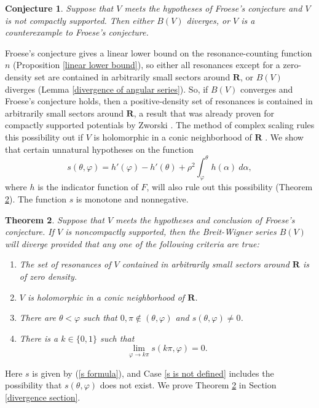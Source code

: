 \documentclass[reqno,12pt,letterpaper]{amsart}
\newcommand{\RR}{\mathbf{R}}
\newtheorem{theorem}{Theorem}[section]
\newtheorem{conjecture}[theorem]{Conjecture}
\theoremstyle{definition}
\begin{document}
\begin{conjecture}
\label{weak conjecture}
Suppose that $V$ meets the hypotheses of Froese's conjecture and $V$ is not compactly supported. Then either $B(V)$ diverges, or $V$ is a counterexample to Froese's conjecture.
\end{conjecture}
Froese's conjecture gives a linear lower bound on the resonance-counting function $n$ (Proposition \ref{linear lower bound}), so either all resonances except for a zero-density set are contained in arbitrarily small sectors around $\RR$, or $B(V)$ diverges (Lemma \ref{divergence of angular series}).
So, if $B(V)$ converges and Froese's conjecture holds, then a positive-density set of resonances is contained in arbitrarily small sectors around $\RR$, a result that was already proven for compactly supported potentials by Zworski \cite{zworski1987distribution}.
The method of complex scaling rules this possibility out if $V$ is holomorphic in a conic neighborhood of $\RR$ \cite[Corollary 12.14]{sjostrand2002lectures}. We show that certain unnatural hypotheses on the function
\begin{equation}
\label{s formula}
s(\theta, \varphi) = h'(\varphi) - h'(\theta) + \rho^2 \int_\varphi^\theta h(\alpha)~d\alpha,
\end{equation}
where $h$ is the indicator function of $F$, will also rule out this possibility (Theorem \ref{divergence of breit wigner, preliminary version}). The function $s$ is monotone and nonnegative.
\begin{theorem}
\label{divergence of breit wigner, preliminary version}
Suppose that $V$ meets the hypotheses and conclusion of Froese's conjecture. If $V$ is noncompactly supported, then the Breit-Wigner series $B(V)$ will diverge provided that any one of the following criteria are true:
\begin{enumerate}
\item The set of resonances of $V$ contained in arbitrarily small sectors around $\RR$ is of zero density. \label{resonances in sectors}
\item $V$ is holomorphic in a conic neighborhood of $\RR$. \label{holomorphic potential}
\item There are $\theta < \varphi$ such that $0,\pi \notin (\theta, \varphi)$ and $s(\theta, \varphi) \neq 0$. \label{s is not defined}
\item There is a $k \in \{0, 1\}$ such that \label{limit of s}
$$\lim_{\varphi \to k\pi} s(k\pi, \varphi) = 0.$$
\end{enumerate}
\end{theorem}
Here $s$ is given by (\ref{s formula}), and Case \ref{s is not defined} includes the possibility that $s(\theta, \varphi)$ does not exist.
We prove Theorem \ref{divergence of breit wigner, preliminary version} in Section \ref{divergence section}.
\end{document}
